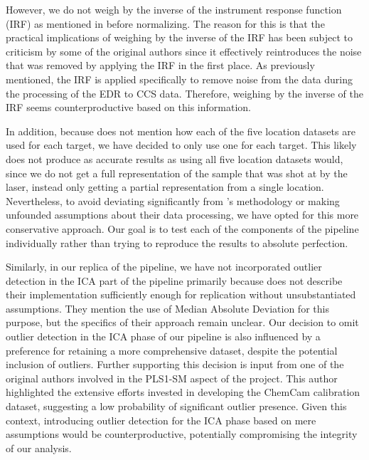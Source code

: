 However, we do not weigh by the inverse of the instrument response function (IRF) as mentioned in \citeauthor{cleggRecalibrationMarsScience2017} before normalizing.
The reason for this is that the practical implications of weighing by the inverse of the IRF has been subject to criticism by some of the original authors since it effectively reintroduces the noise that was removed by applying the IRF in the first place.
As previously mentioned, the IRF is applied specifically to remove noise from the data during the processing of the EDR to CCS data.
Therefore, weighing by the inverse of the IRF seems counterproductive based on this information.

In addition, because \citeauthor{cleggRecalibrationMarsScience2017} does not mention how each of the five location datasets are used for each target, we have decided to only use one for each target.
This likely does not produce as accurate results as using all five location datasets would, since we do not get a full representation of the sample that was shot at by the laser, instead only getting a partial representation from a single location.
Nevertheless, to avoid deviating significantly from \citeauthor{cleggRecalibrationMarsScience2017}'s methodology or making unfounded assumptions about their data processing, we have opted for this more conservative approach.
Our goal is to test each of the components of the pipeline individually rather than trying to reproduce the results to absolute perfection.

Similarly, in our replica of the pipeline, we have not incorporated outlier detection in the ICA part of the pipeline primarily because \citeauthor{cleggRecalibrationMarsScience2017} does not describe their implementation sufficiently enough for replication without unsubstantiated assumptions.
They mention the use of Median Absolute Deviation for this purpose, but the specifics of their approach remain unclear.
Our decision to omit outlier detection in the ICA phase of our pipeline is also influenced by a preference for retaining a more comprehensive dataset, despite the potential inclusion of outliers.
Further supporting this decision is input from one of the original authors involved in the PLS1-SM aspect of the project.
This author highlighted the extensive efforts invested in developing the ChemCam calibration dataset, suggesting a low probability of significant outlier presence.
Given this context, introducing outlier detection for the ICA phase based on mere assumptions would be counterproductive, potentially compromising the integrity of our analysis.

